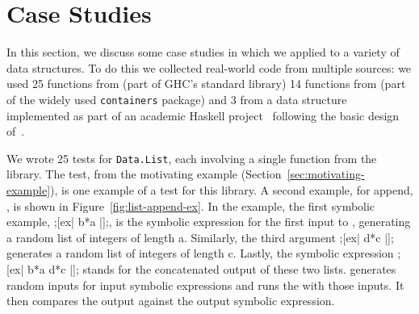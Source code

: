 \section{Case Studies}

In this section, we discuss some case studies in which we applied
\ourDSL to a variety of data structures.
To do this we collected real-world code
from multiple sources:
we used 25 functions from 
(part of GHC's standard library)
 14 functions from  (part of the widely used \texttt{containers} package)
and 3 from a  data structure
implemented as part of an academic Haskell project~\cite{hallahan2019lazy}
following the basic design of~\cite{conchon2007persistent}.


We wrote 25 \ourDSL tests for \texttt{Data.List},
each involving a single function from the library.
The  test, from the motivating example (Section~\ref{sec:motivating-example}),
is one example of a test for this library.
A second example, for append, \hskin{(++)},
is shown in Figure~\ref{fig:list-append-ex}.
In the \hskin{(++)} example, the first symbolic example, \hskin;[ex| b*{a} |];,
is the symbolic expression for the 
first input to \hskin{(++)}, generating a random list of integers of length a. 
Similarly, the third argument \hskin;[ex| d*{c} |]; generates a random list 
of integers of length c. Lastly, the symbolic expression \hskin;[ex| b*{a} d*{c} |]; 
stands for the concatenated output of these two lists. 
\ourDSL generates random inputs for input symbolic expressions and 
runs the \hskin{(++)} with those inputs. 
It then compares the output against the output symbolic expression. 

